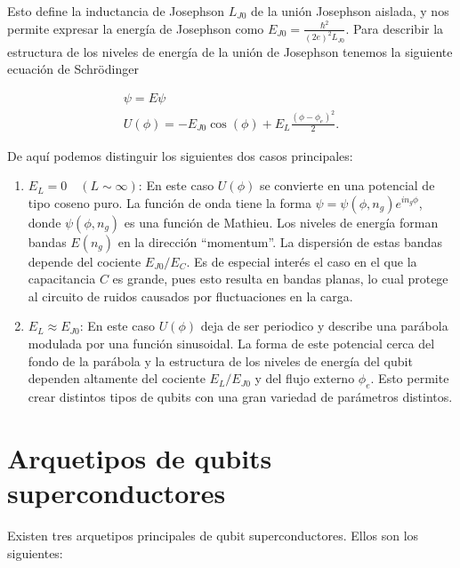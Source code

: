 Esto define la inductancia de Josephson $L_{J0}$ de la unión Josephson aislada, y nos permite expresar la energía de Josephson como $E_{J0} = \frac{\hbar^2}{(2e)^2L_{J0}}$. Para describir la estructura de los niveles de energía de la unión de Josephson tenemos la siguiente ecuación de Schrödinger

\begin{align}
[E_C (-i\hbar \frac{\partial}{\partial\phi}-n_g)^2 + U(\phi)] \psi = E \psi \\
U(\phi) = -E_{J0} \cos(\phi) + E_L \frac{(\phi-\phi_e)^2}{2} .
\end{align}

De aquí podemos distinguir los siguientes dos casos principales:

\begin{enumerate}
    \item $E_L = 0 \quad (L \sim \infty)$: En este caso $U(\phi)$ se convierte en una potencial de tipo coseno puro. La función de onda tiene la forma $\psi = \psi(\phi, n_g) e^{i n_g \phi}$, donde $\psi(\phi, n_g)$ es una función de Mathieu. Los niveles de energía forman bandas $E(n_g)$ en la dirección ``momentum''. La dispersión de estas bandas depende del cociente $E_{J0}/E_C$. Es de especial interés el caso en el que la capacitancia $C$ es grande, pues esto resulta en bandas planas, lo cual protege al circuito de ruidos causados por fluctuaciones en la carga.
    \item $E_L \approx E_{J0}$: En este caso $U(\phi)$ deja de ser periodico y describe una parábola modulada por una función sinusoidal. La forma de este potencial cerca del fondo de la parábola y la estructura de los niveles de energía del qubit dependen altamente del cociente $E_L/E_{J0}$ y del flujo externo $\phi_e$. Esto permite crear distintos tipos de qubits con una gran variedad de parámetros distintos.
\end{enumerate}

\section{Arquetipos de qubits superconductores}

Existen tres arquetipos principales de qubit superconductores. Ellos son los siguientes:

